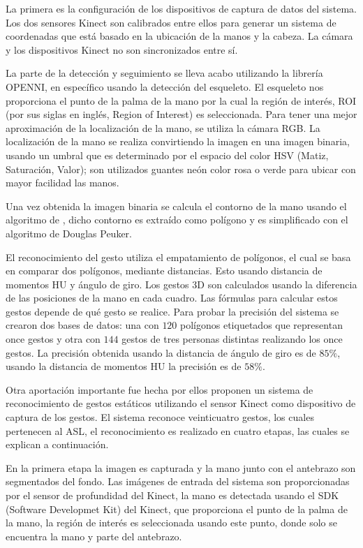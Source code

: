 La primera es la configuración de los dispositivos de captura de datos del sistema. Los dos sensores Kinect son calibrados entre ellos para generar un sistema de coordenadas que está basado en la ubicación de la  manos y la cabeza. La cámara y los dispositivos Kinect no son sincronizados entre sí.  

La parte de la detección y seguimiento  se lleva acabo utilizando la librería OPENNI, en específico usando la detección del esqueleto. El esqueleto nos proporciona el punto de la palma de la mano por la cual la región de interés, ROI (por sus siglas en inglés, Region of Interest) es seleccionada. Para tener una  mejor aproximación de la localización de la mano, se utiliza la cámara RGB. La localización de la mano se realiza convirtiendo la imagen en una imagen binaria, usando un umbral que es determinado por el espacio del color HSV (Matiz, Saturación, Valor); son utilizados guantes neón color rosa o verde para ubicar con mayor facilidad las manos.   

Una vez obtenida la imagen binaria se calcula el contorno de la mano usando el algoritmo de \citep{Chang2004}, dicho contorno es extraído como polígono y  es simplificado con el algoritmo de Douglas Peuker. 

El reconocimiento del gesto utiliza el empatamiento de polígonos, el cual se basa en comparar dos polígonos, mediante distancias. Esto usando distancia de momentos HU y ángulo de giro. 
Los gestos 3D son calculados usando la diferencia de las posiciones de la mano en cada cuadro. Las fórmulas para calcular estos gestos depende de qué gesto se  realice.  
Para probar la precisión del sistema se crearon dos bases de datos: una con $120$ polígonos etiquetados que representan once gestos y otra con $144$ gestos de tres personas distintas realizando los once gestos. La precisión obtenida usando la distancia de ángulo de giro es de $85 \%$, usando la distancia de momentos HU la precisión es de $58 \%$.  


Otra aportación importante fue hecha por \citep{Kang2013} ellos proponen un sistema de reconocimiento de  gestos estáticos utilizando el sensor Kinect como dispositivo de captura de los gestos. El sistema reconoce veinticuatro gestos, los cuales pertenecen al ASL, el reconocimiento es realizado en cuatro etapas, las cuales se explican a continuación.  

En la primera etapa la imagen es capturada y la mano junto con el antebrazo son segmentados del fondo. Las imágenes de entrada del sistema son proporcionadas por el sensor de profundidad del Kinect, la mano es detectada usando el SDK (Software Developmet Kit) del Kinect, que proporciona el punto de la palma de la mano, la región de interés es seleccionada usando este punto, donde  solo se encuentra la mano y parte del antebrazo.   

